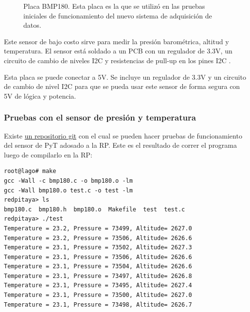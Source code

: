\documentclass[a4paper,11pt]{article}
\begin{document}
\begin{figure}[!h]
  \centering
  \caption{Placa BMP180. Esta placa es la que se utilizó en
las pruebas iniciales de funcionamiento del nuevo sistema de adquisición de
datos.}
  \label{fig:bmp180}
\end{figure}

Este sensor de bajo costo sirve para medir la presión barométrica, altitud y
temperatura. El sensor está soldado a un PCB con un regulador de 3.3V, un
circuito de cambio de niveles I2C y resistencias de pull-up en los pines I2C
\cite{bibBMP180}.

Esta placa se puede conectar a 5V. Se incluye un regulador de 3.3V y un circuito de
cambio de nivel I2C para que se pueda usar este sensor de forma segura con 5V de
lógica y potencia.

\subsubsection{Pruebas con el sensor de presión y temperatura}
Existe \href{https://github.com/lagoprojectrp/rp\_bmp180}{un repositorio
git} con el cual se pueden hacer pruebas de funcionamiento del sensor de PyT
adosado a la RP. Este es el resultado de correr el programa luego de compilarlo
en la RP:
\begin{verbatim}
root@lago# make
gcc -Wall -c bmp180.c -o bmp180.o -lm
gcc -Wall bmp180.o test.c -o test -lm
redpitaya> ls
bmp180.c  bmp180.h  bmp180.o  Makefile  test  test.c
redpitaya> ./test
Temperature = 23.2, Pressure = 73499, Altitude= 2627.0
Temperature = 23.2, Pressure = 73506, Altitude= 2626.6
Temperature = 23.1, Pressure = 73502, Altitude= 2627.3
Temperature = 23.1, Pressure = 73506, Altitude= 2626.6
Temperature = 23.1, Pressure = 73504, Altitude= 2626.6
Temperature = 23.1, Pressure = 73497, Altitude= 2626.8
Temperature = 23.1, Pressure = 73495, Altitude= 2627.4
Temperature = 23.1, Pressure = 73500, Altitude= 2627.0
Temperature = 23.1, Pressure = 73498, Altitude= 2626.7
\end{verbatim}
\end{document}
